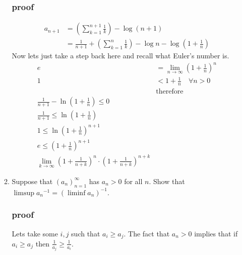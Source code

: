 \documentclass[letterpaper]{article}
\begin{document}
\begin{enumerate}
\begin{enumerate}
  \subsubsection*{proof}
  \begin{align*}
    a_{n+1}&=\left(\sum\limits_{k=1}^{n+1}{\frac{1}{k}}\right)-\log (n+1)\\
    &=\frac{1}{n+1}+\left(\sum\limits_{k=1}^{n}{\frac{1}{k}}\right)-\log n-\log \left(1+\frac{1}{n}\right)
  \end{align*}
  Now lets just take a step back here and recall what Euler's number is.
  \begin{align*}
    e&=\lim_{n\to\infty}\left(1+\frac{1}{n}\right)^n\\
    1&<1+\frac{1}{n}\quad\forall n>0\\
    &\text{therefore}\\
    \frac{1}{n+1}-\ln\left(1+\frac{1}{n}\right)\le 0\\
    \frac{1}{n+1}\le\ln\left(1+\frac{1}{n}\right)\\
    1\le\ln\left(1+\frac{1}{n}\right)^{n+1}\\
    e\le\left(1+\frac{1}{n}\right)^{n+1}\\
    \lim_{k\to\infty}\left(1+\frac{1}{n+k}\right)^n\cdot\left(1+\frac{1}{n+k}\right)^{n+k}
  \end{align*}
  \setcounter{enumii}{12}
  \item
  Suppose that $(a_n)_{n=1}^\infty$ has $a_n>0$ for all $n$. Show that $\limsup {a_n}^{-1}=(\liminf a_n)^{-1}$.
  \subsubsection*{proof}
  Lets take some $i,j$ such that $a_i\ge a_j$.
  The fact that $a_n>0$ implies that if $a_i\ge a_j$ then $\frac{1}{a_j}\ge \frac{1}{a_i}$.

  \end{enumerate}
\end{enumerate}
\end{document}
